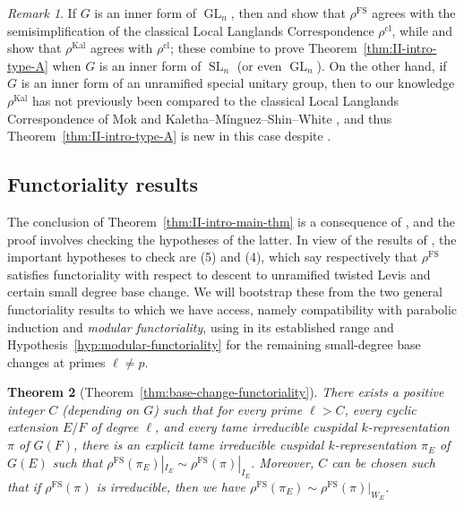 \documentclass[reqno]{amsart}
\numberwithin{equation}{subsection}
\DeclareMathOperator{\GL}{GL}
\DeclareMathOperator{\SL}{SL}
\DeclareMathOperator{\FS}{FS}
\DeclareMathOperator{\Kal}{Kal}
\newtheorem{thm}{Theorem}[subsection]
\theoremstyle{remark}
\newtheorem{remark}[thm]{Remark}
\numberwithin{equation}{subsection}
\numberwithin{figure}{subsection}
\begin{document}
\begin{remark}\label{rem:type-A} If $G$ is an inner form of $\GL_n$, then \cite[Theorem I.9.6 (ix)]{FS} and \cite[Theorem 1.0.3]{HKW22} show that $\rho^{\FS}$ agrees with the semisimplification of the classical Local Langlands Correspondence $\rho^{\mathrm{cl}}$, while \cite[Theorem 1.1]{OT21} and \cite[Theorem 0.1]{Tok23} show that $\rho^{\Kal}$ agrees with $\rho^{\mathrm{cl}}$; these combine to prove Theorem~\ref{thm:II-intro-type-A} when $G$ is an inner form of $\SL_n$ (or even $\GL_n$). On the other hand, if $G$ is an inner form of an unramified special unitary group, then to our knowledge $\rho^{\Kal}$ has not previously been compared to the classical Local Langlands Correspondence of Mok \cite{Mok15} and Kaletha--M\'{i}nguez--Shin--White \cite{KMSW14}, and thus Theorem~\ref{thm:II-intro-type-A} is new in this case despite \cite[Theorem II]{DvHKZ26}.
\end{remark}


\subsection{Functoriality results}

The conclusion of Theorem~\ref{thm:II-intro-main-thm} is a consequence of \cite[Theorem~1.3.1]{CF26a}, and the proof involves checking the hypotheses of the latter. In view of the results of \cite[Theorem I.9.6]{FS}, the important hypotheses to check are (5) and (4), which say respectively that $\rho^{\FS}$ satisfies functoriality with respect to descent to unramified twisted Levis and certain small degree base change. We will bootstrap these from the two general functoriality results to which we have access, namely compatibility with parabolic induction \cite[Theorem I.9.6(viii)]{FS} and \emph{modular functoriality}, using \cite[Theorem 1.3.1]{F24} in its established range and Hypothesis~\ref{hyp:modular-functoriality} for the remaining small-degree base changes at primes $\ell \neq p$.

\begin{thm}[Theorem~\ref{thm:base-change-functoriality}]\label{thm:II-intro-large-degree-bc}
There exists a positive integer $C$ (depending on $G$) such that for every prime $\ell > C$, every cyclic extension $E/F$ of degree $\ell$, and every tame irreducible cuspidal $k$-representation $\pi$ of $G(F)$, there is an explicit tame irreducible cuspidal $k$-representation $\pi_E$ of $G(E)$ such that $\rho^{\FS}(\pi_E)|_{I_E} \sim \rho^{\FS}(\pi)|_{I_E}$. Moreover, $C$ can be chosen such that if $\rho^{\FS}(\pi)$ is irreducible, then we have $\rho^{\FS}(\pi_E) \sim \rho^{\FS}(\pi)|_{W_E}$.
\end{thm}
\end{document}
